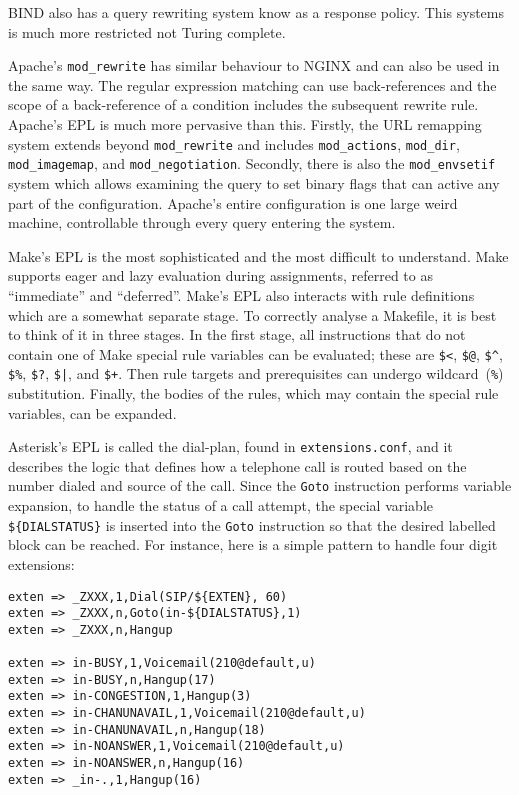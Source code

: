 \documentclass[letterpaper,twocolumn,10pt]{article}
\begin{document}
BIND also has a query rewriting system know as a response policy. This systems is much more restricted not Turing complete.

Apache's \verb!mod_rewrite! has similar behaviour to NGINX and can also be used in the same way. The regular expression matching can use back-references and the scope of a back-reference of a condition includes the subsequent rewrite rule. Apache's EPL is much more pervasive than this. Firstly, the URL remapping system extends beyond \verb!mod_rewrite! and includes \verb!mod_actions!, \verb!mod_dir!, \verb!mod_imagemap!, and \verb!mod_negotiation!. Secondly, there is also the \verb!mod_envsetif! system which allows examining the query to set binary flags that can active any part of the configuration. Apache's entire configuration is one large weird machine, controllable through every query entering the system.

Make's EPL is the most sophisticated and the most difficult to understand. Make supports eager and lazy evaluation during assignments, referred to as ``immediate'' and ``deferred''. Make's EPL also interacts with rule definitions which are a somewhat separate stage. To correctly analyse a Makefile, it is best to think of it in three stages. In the first stage, all instructions that do not contain one of Make special rule variables can be evaluated; these are \texttt{\$<}, \texttt{\$@}, \texttt{\$\^{}}, \texttt{\$\%}, \texttt{\$?}, \texttt{\$|}, and \texttt{\$+}. Then rule targets and prerequisites can undergo wildcard~(\texttt{\%}) substitution. Finally, the bodies of the rules, which may contain the special rule variables, can be expanded.

Asterisk's EPL is called the dial-plan, found in \texttt{extensions.conf}, and it describes the logic that defines how a telephone call is routed based on the number dialed and source of the call. Since the \texttt{Goto} instruction performs variable expansion, to handle the status of a call attempt, the special variable \texttt{\$\{DIALSTATUS\}} is inserted into the \texttt{Goto} instruction so that the desired labelled block can be reached. For instance, here is a simple pattern to handle four digit extensions:

{\scriptsize
\begin{verbatim}
exten => _ZXXX,1,Dial(SIP/${EXTEN}, 60)
exten => _ZXXX,n,Goto(in-${DIALSTATUS},1)
exten => _ZXXX,n,Hangup

exten => in-BUSY,1,Voicemail(210@default,u)
exten => in-BUSY,n,Hangup(17)
exten => in-CONGESTION,1,Hangup(3)
exten => in-CHANUNAVAIL,1,Voicemail(210@default,u)
exten => in-CHANUNAVAIL,n,Hangup(18)
exten => in-NOANSWER,1,Voicemail(210@default,u)
exten => in-NOANSWER,n,Hangup(16)
exten => _in-.,1,Hangup(16)
\end{verbatim}
}
\end{document}
